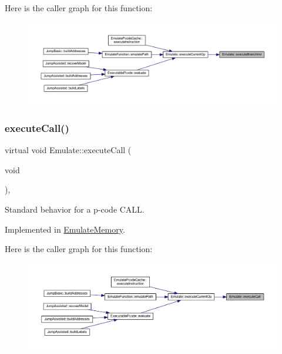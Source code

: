 Here is the caller graph for this function\+:
\nopagebreak
\begin{figure}[H]
\begin{center}
\leavevmode
\includegraphics[width=350pt]{class_emulate_a9b2a5e6e6328d22c6143a5ca7d3ce4e4_icgraph}
\end{center}
\end{figure}
\mbox{\label{class_emulate_abdb4b20ec872310aba005d54813c35ce}} 
\subsubsection{\texorpdfstring{executeCall()}{executeCall()}}
{\footnotesize\ttfamily virtual void Emulate\+::execute\+Call (\begin{DoxyParamCaption}\item[{void}]{ }\end{DoxyParamCaption})\hspace{0.3cm}{\ttfamily [protected]}, {}}



Standard behavior for a p-\/code C\+A\+LL. 



Implemented in \mbox{\hyperlink{class_emulate_memory_a20537bae3d7f06adeae32f99d1867b12}{Emulate\+Memory}}.

Here is the caller graph for this function\+:
\nopagebreak
\begin{figure}[H]
\begin{center}
\leavevmode
\includegraphics[width=350pt]{class_emulate_abdb4b20ec872310aba005d54813c35ce_icgraph}
\end{center}
\end{figure}
\mbox{\label{class_emulate_aa3579bd388004b72fab0e62175aeb1a0}} 
